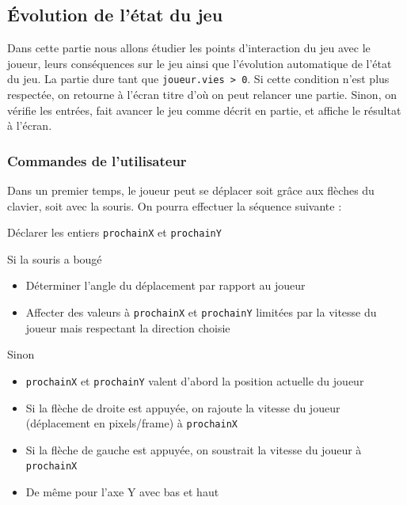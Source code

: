 
\subsection{Évolution de l'état du jeu}

Dans cette partie nous allons étudier les points d'interaction du jeu avec le joueur, leurs conséquences sur le jeu ainsi que l'évolution automatique de l'état du jeu. La partie dure tant que \texttt{joueur.vies > 0}. Si cette condition n'est plus respectée, on retourne à l'écran titre d'où on peut relancer une partie. Sinon, on vérifie les entrées, fait avancer le jeu comme décrit en partie, et affiche le résultat à l'écran.

\subsubsection{Commandes de l'utilisateur}
Dans un premier temps, le joueur peut se déplacer soit grâce aux flèches du clavier, soit avec la souris. On pourra effectuer la séquence suivante :
\begin{algoinfo}
	\item Déclarer les entiers \texttt{prochainX} et \texttt{prochainY}
	\item Si la souris a bougé
	\begin{itemize}
		\item Déterminer l'angle du déplacement par rapport au joueur
		\item Affecter des valeurs à \texttt{prochainX} et \texttt{prochainY} limitées par la vitesse du joueur mais respectant la direction choisie
	\end{itemize}
	\item Sinon
	\begin{itemize}
		\item \texttt{prochainX} et \texttt{prochainY} valent d'abord la position actuelle du joueur
		\item Si la flèche de droite est appuyée, on rajoute la vitesse du joueur (déplacement en pixels/frame) à \texttt{prochainX}
		\item Si la flèche de gauche est appuyée, on soustrait la vitesse du joueur à \texttt{prochainX}
		\item De même pour l'axe Y avec bas et haut
	\end{itemize}
\end{algoinfo}

